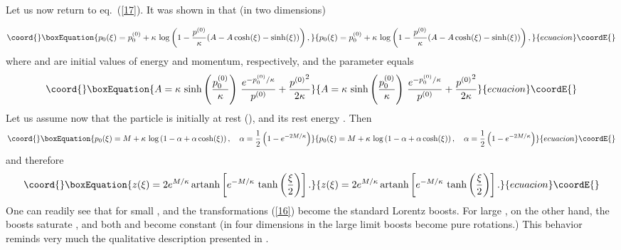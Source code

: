 \documentclass[a4paper,a4paper]{article}
\begin{document}
Let us now return to eq.~(\ref{17}). It was shown in \cite{rbgacjkg} that (in two dimensions)

\begin{equation}\coord{}\boxEquation{\label{18}
p_0(\xi) = p^{(0)}_0+\kappa\, \log\left(1-\frac{p^{(0)}}{\kappa} (A-A\, {\cosh}(\xi)-{\sinh}(\xi))\right),
}{p_0(\xi) = p^{(0)}_0+\kappa\, \log\left(1-\frac{p^{(0)}}{\kappa} (A-A\, {\cosh}(\xi)-{\sinh}(\xi))\right),
}{ecuacion}\coordE{}\end{equation}
where \coordHE{} and \coordHE{} are initial values of energy and momentum, respectively, and  the parameter \coordHE{} equals
\begin{equation}\coord{}\boxEquation{\label{19}
  A=\kappa\, \sinh\left(\frac{p^{(0)}_0}{\kappa}\right)\, 
  \frac{e^{-p^{(0)}_0/\kappa}}{ p^{(0)}}+\frac{{p^{(0)}}^2}{2\kappa}
}{A=\kappa\, \sinh\left(\frac{p^{(0)}_0}{\kappa}\right)\, 
  \frac{e^{-p^{(0)}_0/\kappa}}{ p^{(0)}}+\frac{{p^{(0)}}^2}{2\kappa}
}{ecuacion}\coordE{}\end{equation}
Let us assume now that the particle is initially at rest (\coordHE{}), and its rest energy \coordHE{}. Then
\begin{equation}\coord{}\boxEquation{\label{20}
 p_0(\xi) = M+\kappa\, \log\left(1-\alpha + \alpha\, {\cosh}(\xi)\right),\quad \alpha = \frac12 \left( 1 - e^{-2M/\kappa}\right)
}{p_0(\xi) = M+\kappa\, \log\left(1-\alpha + \alpha\, {\cosh}(\xi)\right),\quad \alpha = \frac12 \left( 1 - e^{-2M/\kappa}\right)
}{ecuacion}\coordE{}\end{equation}
and therefore
\begin{equation}\coord{}\boxEquation{\label{21}
 z(\xi) = 2 e^{M/\kappa}\, \mbox{artanh}\left[e^{-M/\kappa}\, \tanh\left(\frac\xi2\right)\right].
}{z(\xi) = 2 e^{M/\kappa}\, \mbox{artanh}\left[e^{-M/\kappa}\, \tanh\left(\frac\xi2\right)\right].
}{ecuacion}\coordE{}\end{equation}
One can readily see that for small \myHighlight{$\xi$}\coordHE{}, \coordHE{} and the transformations (\ref{16}) become the standard Lorentz boosts. For large \myHighlight{$\xi$}\coordHE{}, on the other hand, the boosts saturate \coordHE{}, and both \coordHE{} and \coordHE{} become constant (in four dimensions in the large \myHighlight{$\xi$}\coordHE{} limit boosts become pure rotations.)
 This behavior reminds very much the qualitative description presented in \cite{suss}.
\end{document}
